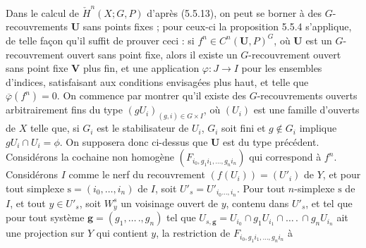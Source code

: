 Dans le calcul de $\check H^n(X;G,P)$ d'après (5.5.13), on peut se borner à
des $G$-recouvrements ${\mathbf U}$ sans points fixes ; pour ceux-ci la
proposition 5.5.4 s'applique, de telle façon qu'il suffit de prouver ceci : si
$f^n\in C^n({\mathbf U},P)^G$, où ${\mathbf U}$ est un $G$-recouvrement ouvert
sans point fixe, alors il existe un $G$-recouvrement ouvert sans point fixe
${\mathbf V}$ plus fin, et une application $\varphi:J\to I$ pour les ensembles
d'indices, satisfaisant aux conditions envisagées plus haut, et telle que
$\overline\varphi(f^n)=0$. On commence par montrer qu'il existe des
$G$-recouvrements ouverts arbitrairement fins du type
$(gU_i)_{(g,i)\in G\times I}$, où $(U_i)$ est une famille d'ouverts de $X$
telle que, si $G_i$ est le stabilisateur de $U_i$, $G_i$ soit fini et
$g\notin G_i$ implique $gU_i\cap U_i=\phi$. On supposera donc ci-dessus que
${\mathbf U}$ est du type précédent.
Considérons la cochaine non homogène
$(F_{i_0,g_1i_1,\ldots,g_ni_n})$ qui correspond à $f^n$. Considérons $I$
comme le nerf du recouvrement $(f(U_i))=(U'_i)$ de $Y$, et pour tout simplexe
$\mathrm s=(i_0,\ldots,i_n)$ de $I$, soit $U'_s=U'_{i_0\ldots,i_n}$. Pour tout
$n$-simplexe $\mathrm s$ de $I$, et tout $y\in U'_s$, soit $W^s_y$ un voisinage
ouvert de $y$, contenu dans $U'_s$, et tel que pour tout système
$\mathbf g=(g_1,\ldots\,.,g_n)$ tel que
$U_{s,\mathbf g}=U_{i_0}\cap g_1U_{i_1}\cap\ldots\,.\,\cap g_nU_{i_n}$ ait une
projection sur $Y$ qui contient $y$, la restriction de
$F_{i_0,g_1i_1,\ldots,g_ni_n}$ à


